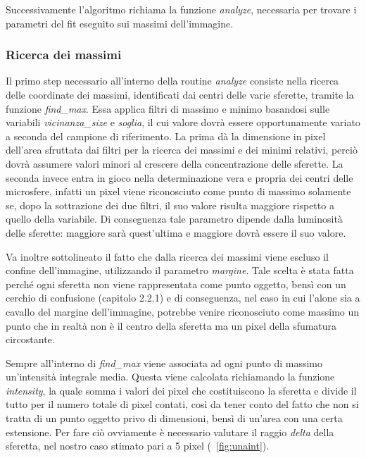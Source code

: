 Successivamente l'algoritmo richiama la funzione \textit{analyze}, necessaria per trovare i parametri del fit eseguito sui massimi dell'immagine. 

\subsubsection*{Ricerca dei massimi}

Il primo step necessario all'interno della routine \textit{analyze} consiste nella ricerca delle coordinate dei massimi, identificati dai centri delle varie sferette, tramite la funzione \textit{find\_max}. 
Essa applica filtri di massimo e minimo basandosi sulle variabili \textit{vicinanza\_size} e \textit{soglia}, il cui valore dovrà essere opportunamente variato a seconda del campione di riferimento. 
La prima dà la dimensione in pixel dell'area sfruttata dai filtri per la ricerca dei massimi e dei minimi relativi, perciò dovrà assumere valori minori al crescere della concentrazione delle sferette. 
La seconda invece entra in gioco nella determinazione vera e propria dei centri delle microsfere, infatti un pixel viene riconosciuto come punto di massimo solamente se, dopo la sottrazione dei due filtri, il suo valore risulta maggiore rispetto a quello della variabile. 
Di conseguenza tale parametro dipende dalla luminosità delle sferette: maggiore sarà quest'ultima e maggiore dovrà essere il suo valore.

Va inoltre sottolineato il fatto che dalla ricerca dei massimi viene escluso il confine dell'immagine, utilizzando il parametro \textit{margine}. 
Tale scelta è stata fatta perché ogni sferetta non viene rappresentata come punto oggetto, bensì con un cerchio di confusione (capitolo 2.2.1) e di conseguenza, nel caso in cui l'alone sia a cavallo del margine dell'immagine, potrebbe venire riconosciuto come massimo un punto che in realtà non è il centro della sferetta ma un pixel della sfumatura circostante.

Sempre all'interno di \textit{find\_max} viene associata ad ogni punto di massimo un'intensità integrale media. 
Questa viene calcolata richiamando la funzione \textit{intensity}, la quale somma i valori dei pixel che costituiscono la sferetta e divide il tutto per il numero totale di pixel contati, così da tener conto del fatto che non si tratta di un punto oggetto privo di dimensioni, bensì di un'area con una certa estensione. 
Per fare ciò ovviamente è necessario valutare il raggio \textit{delta} della sferetta, nel nostro caso stimato pari a 5 pixel (\figurename~\ref{fig:unaint}).

